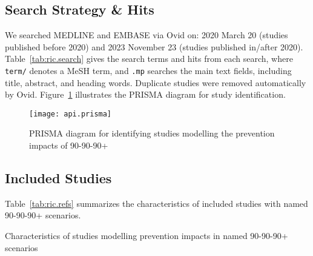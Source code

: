\subsection{Search Strategy \& Hits}\label{sr.ric.search}
We searched MEDLINE and EMBASE via Ovid on:
2020 March 20 (studies published before 2020) and
2023 November 23 (studies published in/after 2020).
Table~\ref{tab:ric.search} gives the search terms and hits from each search, where
\texttt{term/} denotes a MeSH term, and
\texttt{.mp} searches the main text fields, including title, abstract, and heading words.
Duplicate studies were removed automatically by Ovid.
Figure~\ref{fig:api.prisma} illustrates the PRISMA diagram for study identification.

\begin{figure}
  \centering
  \texttt{[image: api.prisma]}
  \caption{PRISMA diagram for identifying studies modelling the prevention impacts of 90-90-90+}
  \label{fig:api.prisma}
\end{figure}
\subsection{Included Studies}\label{sr.ric.refs}
Table~\ref{tab:ric.refs} summarizes the
characteristics of included studies with named 90-90-90+ scenarios.
\begin{landscape}
\begin{table}
  \caption{Characteristics of studies modelling prevention impacts in named 90-90-90+ scenarios}
  \centering
  
  \label{tab:ric.refs}
\end{table}
\end{landscape}
